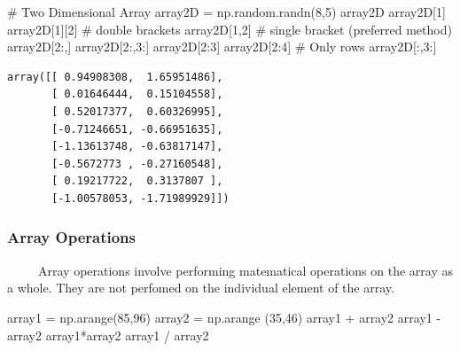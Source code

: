 \documentclass[
  letterpaper,
  DIV=11,
  numbers=noendperiod]{scrreprt}
\newenvironment{Shaded}{\begin{snugshade}}{\end{snugshade}}
\newcommand{\CommentTok}[1]{\textcolor[rgb]{0.37,0.37,0.37}{#1}}
\newcommand{\DecValTok}[1]{\textcolor[rgb]{0.68,0.00,0.00}{#1}}
\newcommand{\NormalTok}[1]{\textcolor[rgb]{0.00,0.23,0.31}{#1}}
\newcommand{\OperatorTok}[1]{\textcolor[rgb]{0.37,0.37,0.37}{#1}}
\begin{document}
\begin{Shaded}
\begin{Highlighting}[]
\CommentTok{\# Two Dimensional Array }
\NormalTok{array2D }\OperatorTok{=}\NormalTok{ np.random.randn(}\DecValTok{8}\NormalTok{,}\DecValTok{5}\NormalTok{)}
\NormalTok{array2D}
\NormalTok{array2D[}\DecValTok{1}\NormalTok{]}
\NormalTok{array2D[}\DecValTok{1}\NormalTok{][}\DecValTok{2}\NormalTok{] }\CommentTok{\# double brackets }
\NormalTok{array2D[}\DecValTok{1}\NormalTok{,}\DecValTok{2}\NormalTok{] }\CommentTok{\# single bracket (preferred method)}
\NormalTok{array2D[}\DecValTok{2}\NormalTok{:,]}
\NormalTok{array2D[}\DecValTok{2}\NormalTok{:,}\DecValTok{3}\NormalTok{:]}
\NormalTok{array2D[}\DecValTok{2}\NormalTok{:}\DecValTok{3}\NormalTok{]}
\NormalTok{array2D[}\DecValTok{2}\NormalTok{:}\DecValTok{4}\NormalTok{] }\CommentTok{\# Only rows }
\NormalTok{array2D[:,}\DecValTok{3}\NormalTok{:]}
\end{Highlighting}
\end{Shaded}

\begin{verbatim}
array([[ 0.94908308,  1.65951486],
       [ 0.01646444,  0.15104558],
       [ 0.52017377,  0.60326995],
       [-0.71246651, -0.66951635],
       [-1.13613748, -0.63817147],
       [-0.5672773 , -0.27160548],
       [ 0.19217722,  0.3137807 ],
       [-1.00578053, -1.71989929]])
\end{verbatim}

\subsubsection{Array Operations}\label{array-operations}

~~~~~Array operations involve performing matematical operations on the
array as a whole. They are not perfomed on the individual element of the
array.

\begin{Shaded}
\begin{Highlighting}[]
\NormalTok{array1 }\OperatorTok{=}\NormalTok{ np.arange(}\DecValTok{85}\NormalTok{,}\DecValTok{96}\NormalTok{)}
\NormalTok{array2 }\OperatorTok{=}\NormalTok{ np.arange (}\DecValTok{35}\NormalTok{,}\DecValTok{46}\NormalTok{)}
\NormalTok{array1 }\OperatorTok{+}\NormalTok{ array2}
\NormalTok{array1 }\OperatorTok{{-}}\NormalTok{ array2}
\NormalTok{array1}\OperatorTok{*}\NormalTok{array2}
\NormalTok{array1 }\OperatorTok{/}\NormalTok{ array2}
\end{Highlighting}
\end{Shaded}
\end{document}
